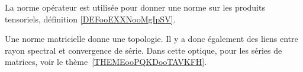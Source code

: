     La norme opérateur est utilisée pour donner une norme sur les produits tensoriels, définition \ref{DEFooEXXNooMgIpSV}.

    Une norme matricielle donne une topologie. Il y a donc également des liens entre rayon spectral et convergence de série. Dans cette optique, pour les séries de matrices, voir le thème~\ref{THEMEooPQKDooTAVKFH}.

